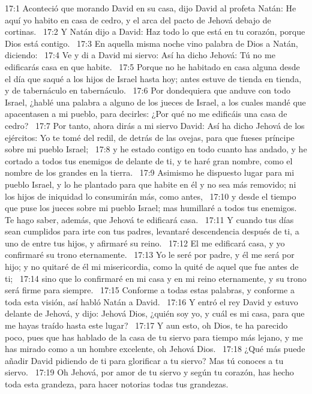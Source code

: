 17:1 Aconteció que morando David en su casa, dijo David al profeta Natán: He aquí yo habito en casa de cedro, y el arca del pacto de Jehová debajo de cortinas.  
17:2 Y Natán dijo a David: Haz todo lo que está en tu corazón, porque Dios está contigo.  
17:3 En aquella misma noche vino palabra de Dios a Natán, diciendo:  
17:4 Ve y di a David mi siervo: Así ha dicho Jehová: Tú no me edificarás casa en que habite.  
17:5 Porque no he habitado en casa alguna desde el día que saqué a los hijos de Israel hasta hoy; antes estuve de tienda en tienda, y de tabernáculo en tabernáculo.  
17:6 Por dondequiera que anduve con todo Israel, ¿hablé una palabra a alguno de los jueces de Israel, a los cuales mandé que apacentasen a mi pueblo, para decirles: ¿Por qué no me edificáis una casa de cedro?  
17:7 Por tanto, ahora dirás a mi siervo David: Así ha dicho Jehová de los ejércitos: Yo te tomé del redil, de detrás de las ovejas, para que fueses príncipe sobre mi pueblo Israel;  
17:8 y he estado contigo en todo cuanto has andado, y he cortado a todos tus enemigos de delante de ti, y te haré gran nombre, como el nombre de los grandes en la tierra.  
17:9 Asimismo he dispuesto lugar para mi pueblo Israel, y lo he plantado para que habite en él y no sea más removido; ni los hijos de iniquidad lo consumirán más, como antes,  
17:10 y desde el tiempo que puse los jueces sobre mi pueblo Israel; mas humillaré a todos tus enemigos. Te hago saber, además, que Jehová te edificará casa.  
17:11 Y cuando tus días sean cumplidos para irte con tus padres, levantaré descendencia después de ti, a uno de entre tus hijos, y afirmaré su reino.  
17:12 El me edificará casa, y yo confirmaré su trono eternamente.  
17:13 Yo le seré por padre, y él me será por hijo; y no quitaré de él mi misericordia, como la quité de aquel que fue antes de ti;  
17:14 sino que lo confirmaré en mi casa y en mi reino eternamente, y su trono será firme para siempre.  
17:15 Conforme a todas estas palabras, y conforme a toda esta visión, así habló Natán a David.  
17:16 Y entró el rey David y estuvo delante de Jehová, y dijo: Jehová Dios, ¿quién soy yo, y cuál es mi casa, para que me hayas traído hasta este lugar?  
17:17 Y aun esto, oh Dios, te ha parecido poco, pues que has hablado de la casa de tu siervo para tiempo más lejano, y me has mirado como a un hombre excelente, oh Jehová Dios.  
17:18 ¿Qué más puede añadir David pidiendo de ti para glorificar a tu siervo? Mas tú conoces a tu siervo.  
17:19 Oh Jehová, por amor de tu siervo y según tu corazón, has hecho toda esta grandeza, para hacer notorias todas tus grandezas.  
